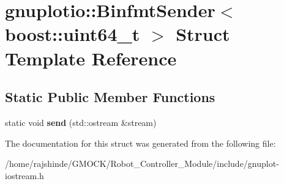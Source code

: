 \hypertarget{structgnuplotio_1_1_binfmt_sender_3_01boost_1_1uint64__t_01_4}{}\section{gnuplotio\+:\+:Binfmt\+Sender$<$ boost\+:\+:uint64\+\_\+t $>$ Struct Template Reference}
\label{structgnuplotio_1_1_binfmt_sender_3_01boost_1_1uint64__t_01_4}
\subsection*{Static Public Member Functions}
\begin{DoxyCompactItemize}
\item 
static void {\bfseries send} (std\+::ostream \&stream)\hypertarget{structgnuplotio_1_1_binfmt_sender_3_01boost_1_1uint64__t_01_4_a9f57162a6baf940675236235556f62ba}{}\label{structgnuplotio_1_1_binfmt_sender_3_01boost_1_1uint64__t_01_4_a9f57162a6baf940675236235556f62ba}

\end{DoxyCompactItemize}


The documentation for this struct was generated from the following file\+:\begin{DoxyCompactItemize}
\item 
/home/rajshinde/\+G\+M\+O\+C\+K/\+Robot\+\_\+\+Controller\+\_\+\+Module/include/gnuplot-\/iostream.\+h\end{DoxyCompactItemize}
